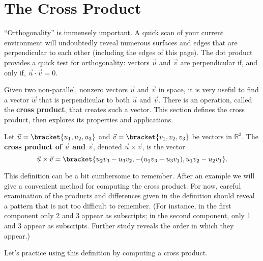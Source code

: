 \section{The Cross Product}\label{sec:cross_product}

``Orthogonality'' is immensely important. A quick scan of your current environment will undoubtedly reveal numerous surfaces and edges that are perpendicular to each other (including the edges of this page). The dot product provides a quick test for orthogonality:  vectors $\vec u$ and $\vec v$ are perpendicular if, and only if, $\vec u\cdot\vec v=0$. 

Given two non-parallel, nonzero vectors $\vec u$ and $\vec v$ in space, it is very useful to find a vector $\vec w$ that is perpendicular to both $\vec u$ and $\vec v$. There is an operation, called the \textbf{cross product}, that creates such a vector. This section defines the cross product, then explores its properties and applications.

\begin{definition}\label{def:cross_product}%
Let $\vec u =\bracket{u_1,u_2,u_3}$ and $\vec v = \bracket{v_1,v_2,v_3}$ be vectors in $\mathbb{R}^3$. The \textbf{cross product of $\vec u$ and $\vec v$}, denoted $\vec u\times\vec v$, is the vector
\[\vec u\times\vec v = \bracket{u_2v_3-u_3v_2,-(u_1v_3-u_3v_1),u_1v_2-u_2v_1}.\]
\end{definition}

This definition can be a bit cumbersome to remember. After an example we will give a convenient method for computing the cross product. For now, careful examination of the products and differences given in the definition should reveal a pattern that is not too difficult to remember. (For instance, in the first component only 2 and 3 appear as subscripts; in the second component, only 1 and 3 appear as subscripts. Further study reveals the order in which they appear.)


Let's practice using this definition by computing a cross product.

